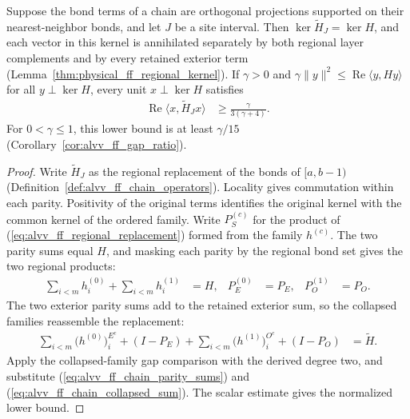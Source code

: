 \begin{lemma}
    \label{lem:alvv_ff_chain_comparison}
    \leanok
    Suppose the bond terms of a chain are orthogonal projections
    supported on their nearest-neighbor bonds, and let $J$ be a site
    interval. Then $\ker\widetilde H_J=\ker H$, and each vector in this
    kernel is annihilated separately by both regional layer complements
    and by every retained exterior term
    (Lemma~\ref{thm:physical_ff_regional_kernel}).
    If $\gamma>0$ and
    $\gamma\|y\|^2\le\operatorname{Re}\langle y,Hy\rangle$ for all
    $y\perp\ker H$, every unit $x\perp\ker H$ satisfies
    \begin{align}
        \operatorname{Re}\langle x,\widetilde H_Jx\rangle
         & \ge\frac{\gamma}{3(\gamma+4)}.
        \label{eq:alvv_ff_chain_gap}
    \end{align}
    For $0<\gamma\le1$, this lower bound is at least $\gamma/15$
    (Corollary~\ref{cor:alvv_ff_gap_ratio}).
\end{lemma}
\begin{proof}\leanok
    Write $\widetilde H_J$ as the regional replacement of the bonds of
    $\lbrack a,b-1)$ (Definition~\ref{def:alvv_ff_chain_operators}).
    Locality gives commutation within each parity. Positivity of the
    original terms identifies
    the original kernel with the common kernel of the ordered family.
    Write $P^{(c)}_S$ for the product of
    (\ref{eq:alvv_ff_regional_replacement}) formed from the family
    $h^{(c)}$. The two parity sums equal $H$, and masking each parity by
    the regional bond set gives the two regional products:
    \begin{align}
        \sum_{i<m}h_i^{(0)}+\sum_{i<m}h_i^{(1)} & =H,   &
        P^{(0)}_E                               & =P_E, &
        P^{(1)}_O                               & =P_O.
        \label{eq:alvv_ff_chain_parity_sums}
    \end{align}
    The two exterior parity sums add to the retained exterior sum, so
    the collapsed families reassemble the replacement:
    \begin{align}
        \sum_{i<m}\bigl(h^{(0)}\bigr)_i^{E^c}+(I-P_E)
        +\sum_{i<m}\bigl(h^{(1)}\bigr)_i^{O^c}+(I-P_O)
         & =\widetilde H.
        \label{eq:alvv_ff_chain_collapsed_sum}
    \end{align}
    Apply the collapsed-family gap comparison with the derived degree
    two, and substitute (\ref{eq:alvv_ff_chain_parity_sums}) and
    (\ref{eq:alvv_ff_chain_collapsed_sum}). The scalar estimate gives
    the normalized lower bound.
\end{proof}

